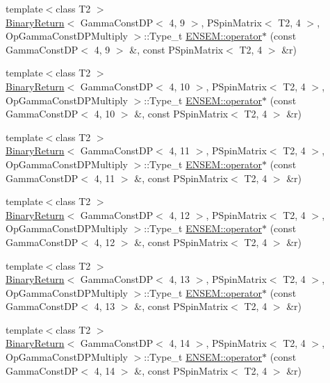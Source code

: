 \begin{DoxyCompactItemize}
\item 
{\footnotesize template$<$class T2 $>$ }\\\mbox{\hyperlink{structBinaryReturn}{Binary\+Return}}$<$ Gamma\+Const\+DP$<$ 4, 9 $>$, P\+Spin\+Matrix$<$ T2, 4 $>$, Op\+Gamma\+Const\+D\+P\+Multiply $>$\+::Type\+\_\+t \mbox{\hyperlink{group__primspinmatrix_gab9e77cb7fcc24e0d8f81fc43b3274d5d}{E\+N\+S\+E\+M\+::operator$\ast$}} (const Gamma\+Const\+DP$<$ 4, 9 $>$ \&, const P\+Spin\+Matrix$<$ T2, 4 $>$ \&r)
\item 
{\footnotesize template$<$class T2 $>$ }\\\mbox{\hyperlink{structBinaryReturn}{Binary\+Return}}$<$ Gamma\+Const\+DP$<$ 4, 10 $>$, P\+Spin\+Matrix$<$ T2, 4 $>$, Op\+Gamma\+Const\+D\+P\+Multiply $>$\+::Type\+\_\+t \mbox{\hyperlink{group__primspinmatrix_gad3aa1e55d31246f4c4f0a15456a84fea}{E\+N\+S\+E\+M\+::operator$\ast$}} (const Gamma\+Const\+DP$<$ 4, 10 $>$ \&, const P\+Spin\+Matrix$<$ T2, 4 $>$ \&r)
\item 
{\footnotesize template$<$class T2 $>$ }\\\mbox{\hyperlink{structBinaryReturn}{Binary\+Return}}$<$ Gamma\+Const\+DP$<$ 4, 11 $>$, P\+Spin\+Matrix$<$ T2, 4 $>$, Op\+Gamma\+Const\+D\+P\+Multiply $>$\+::Type\+\_\+t \mbox{\hyperlink{group__primspinmatrix_ga763e216e29f923dec37a54603419bb2c}{E\+N\+S\+E\+M\+::operator$\ast$}} (const Gamma\+Const\+DP$<$ 4, 11 $>$ \&, const P\+Spin\+Matrix$<$ T2, 4 $>$ \&r)
\item 
{\footnotesize template$<$class T2 $>$ }\\\mbox{\hyperlink{structBinaryReturn}{Binary\+Return}}$<$ Gamma\+Const\+DP$<$ 4, 12 $>$, P\+Spin\+Matrix$<$ T2, 4 $>$, Op\+Gamma\+Const\+D\+P\+Multiply $>$\+::Type\+\_\+t \mbox{\hyperlink{group__primspinmatrix_gac9db04966aafec7cc5029c5dc0e37d4d}{E\+N\+S\+E\+M\+::operator$\ast$}} (const Gamma\+Const\+DP$<$ 4, 12 $>$ \&, const P\+Spin\+Matrix$<$ T2, 4 $>$ \&r)
\item 
{\footnotesize template$<$class T2 $>$ }\\\mbox{\hyperlink{structBinaryReturn}{Binary\+Return}}$<$ Gamma\+Const\+DP$<$ 4, 13 $>$, P\+Spin\+Matrix$<$ T2, 4 $>$, Op\+Gamma\+Const\+D\+P\+Multiply $>$\+::Type\+\_\+t \mbox{\hyperlink{group__primspinmatrix_ga6ecc3bf3d92d81202c48dce547f7027f}{E\+N\+S\+E\+M\+::operator$\ast$}} (const Gamma\+Const\+DP$<$ 4, 13 $>$ \&, const P\+Spin\+Matrix$<$ T2, 4 $>$ \&r)
\item 
{\footnotesize template$<$class T2 $>$ }\\\mbox{\hyperlink{structBinaryReturn}{Binary\+Return}}$<$ Gamma\+Const\+DP$<$ 4, 14 $>$, P\+Spin\+Matrix$<$ T2, 4 $>$, Op\+Gamma\+Const\+D\+P\+Multiply $>$\+::Type\+\_\+t \mbox{\hyperlink{group__primspinmatrix_ga3572342590fe6c5683d22d857b757675}{E\+N\+S\+E\+M\+::operator$\ast$}} (const Gamma\+Const\+DP$<$ 4, 14 $>$ \&, const P\+Spin\+Matrix$<$ T2, 4 $>$ \&r)

\end{DoxyCompactItemize}

